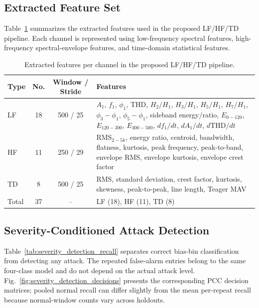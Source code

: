 \documentclass[letterpaper,journal]{IEEEtran}
\begin{document}
\subsection{Extracted Feature Set}
\label{app:feature_set}

Table~\ref{tab:app_extracted_features} summarizes the extracted features used in the proposed LF/HF/TD pipeline. Each channel is represented using low-frequency spectral features, high-frequency spectral-envelope features, and time-domain statistical features.

\begin{table}[t]
\centering
\scriptsize
\caption{Extracted features per channel in the proposed LF/HF/TD pipeline.}
\label{tab:app_extracted_features}
\setlength{\tabcolsep}{3pt}
\renewcommand{\arraystretch}{1.08}
\begin{tabularx}{\columnwidth}{l c c X}
\hline
Type & No. & Window / Stride & Features \\
\hline
LF & 18 & 500 / 25 &
$A_1$, $f_1$, $\phi_1$, THD, $H_2/H_1$, $H_3/H_1$, $H_5/H_1$, $H_7/H_1$,
$\phi_3-\phi_1$, $\phi_5-\phi_1$, sideband energy/ratio,
$E_{0-120}$, $E_{120-300}$, $E_{300-500}$,
$df_1/dt$, $dA_1/dt$, $d\mathrm{THD}/dt$ \\
\hline
HF & 11 & 250 / 29 &
RMS$_{2-5k}$, energy ratio, centroid, bandwidth, flatness, kurtosis,
peak frequency, peak-to-band, envelope RMS, envelope kurtosis, envelope crest factor \\
\hline
TD & 8 & 500 / 25 &
RMS, standard deviation, crest factor, kurtosis, skewness, peak-to-peak, line length, Teager MAV \\
\hline
Total & 37 & -- & LF (18), HF (11), TD (8) \\
\hline
\end{tabularx}
\end{table}


\subsection{Severity-Conditioned Attack Detection}
\label{app:severity_detection}
Table~\ref{tab:severity_detection_recall} separates correct bias-bin classification from detecting any attack. The repeated false-alarm entries belong to the same four-class model and do not depend on the actual attack level. Fig.~\ref{fig:severity_detection_decisions} presents the corresponding PCC decision matrices; pooled normal recall can differ slightly from the mean per-repeat recall because normal-window counts vary across holdouts.
\end{document}
